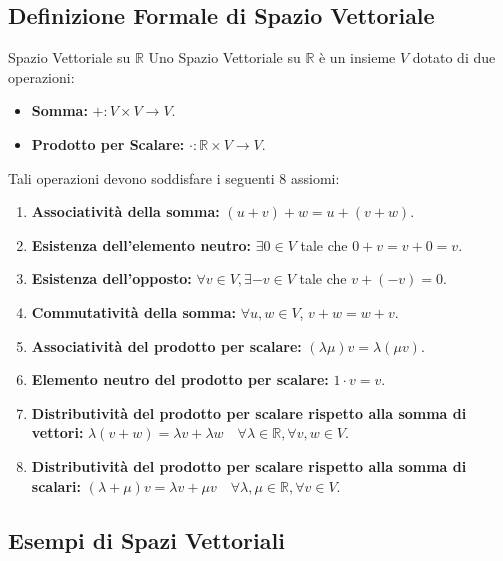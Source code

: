 \documentclass[11pt,a4paper]{article}
\begin{document}
\subsection{Definizione Formale di Spazio Vettoriale}
\begin{definition}{Spazio Vettoriale su $\mathbb{R}$}{}
Uno Spazio Vettoriale su $\mathbb{R}$ è un insieme $V$ dotato di due operazioni:
\begin{itemize}
    \item \textbf{Somma:} $+ : V \times V \longrightarrow V$.
    \item \textbf{Prodotto per Scalare:} $\cdot : \mathbb{R} \times V \longrightarrow V$.
\end{itemize}
Tali operazioni devono soddisfare i seguenti 8 assiomi:
\begin{enumerate}
    \item \textbf{Associatività della somma:} $(u + v) + w = u + (v + w)$.
    \item \textbf{Esistenza dell'elemento neutro:} $\exists 0 \in V$ tale che $0 + v = v + 0 = v$.
    \item \textbf{Esistenza dell'opposto:} $\forall v \in V, \exists -v \in V$ tale che $v + (-v) = 0$.
    \item \textbf{Commutatività della somma:} $\forall u, w \in V$, $v + w = w + v$.
    \item \textbf{Associatività del prodotto per scalare:} $(\lambda \mu)v = \lambda(\mu v)$.
    \item \textbf{Elemento neutro del prodotto per scalare:} $1 \cdot v = v$.
    \item \textbf{Distributività del prodotto per scalare rispetto alla somma di vettori:} $\lambda(v + w) = \lambda v + \lambda w \quad \forall \lambda \in \mathbb{R}, \forall v, w \in V$.
    \item \textbf{Distributività del prodotto per scalare rispetto alla somma di scalari:} $(\lambda + \mu)v = \lambda v + \mu v \quad \forall \lambda, \mu \in \mathbb{R}, \forall v \in V$.
\end{enumerate}
\end{definition}

\subsection{Esempi di Spazi Vettoriali}
\end{document}
